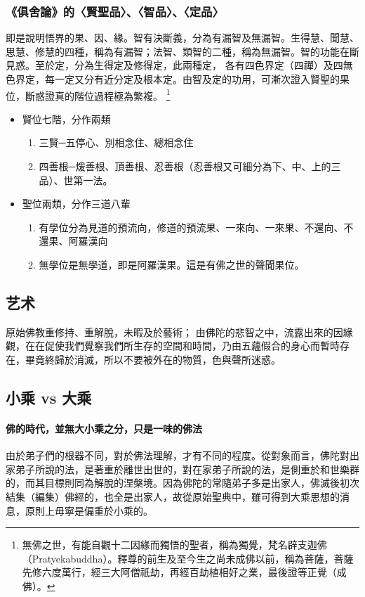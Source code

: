 \subsubsection{《俱舍論》的〈賢聖品〉、〈智品〉、〈定品〉}
即是說明悟界的果、因、緣。智有決斷義，分為有漏智及無漏智。生得慧、聞慧、思慧、修慧的四種，稱為有漏智；法智、類智的二種，稱為無漏智。智的功能在斷見惑。至於定，分為生得定及修得定，此兩種定，
各有四色界定（四禪）及四無色界定，每一定又分有近分定及根本定。由智及定的功用，可漸次證入賢聖的果位，斷惑證真的階位過程極為繁複。
\footnote{無佛之世，有能自觀十二因緣而獨悟的聖者，稱為獨覺，梵名辟支迦佛（Pratyekabuddha）。釋尊的前生及至今生之尚未成佛以前，稱為菩薩，菩薩先修六度萬行，經三大阿僧祇劫，再經百劫植相好之業，最後證等正覺（成佛）。}
\begin{itemize}
  \item
    賢位七階，分作兩類
    \begin{enumerate}
      \item 三賢─五停心、別相念住、總相念住
      \item 四善根─煖善根、頂善根、忍善根（忍善根又可細分為下、中、上的三品）、世第一法。
    \end{enumerate}
  \item
    聖位兩類，分作三道八輩
    \begin{enumerate}
      \item 有學位分為見道的預流向，修道的預流果、一來向、一來果、不還向、不還果、阿羅漢向
      \item 無學位是無學道，即是阿羅漢果。這是有佛之世的聲聞果位。
    \end{enumerate}
\end{itemize}


\subsection{艺术}
原始佛教重修持、重解脫，未暇及於藝術；
由佛陀的悲智之中，流露出來的因緣觀，在在促使我們覺察我們所生存的空間和時間，乃由五蘊假合的身心而暫時存在，畢竟終歸於消滅，所以不要被外在的物質，色與聲所迷惑。

\subsection{小乘 vs 大乘}
\paragraph{佛的時代，並無大小乘之分，只是一味的佛法} 由於弟子們的根器不同，對於佛法理解，才有不同的程度。從對象而言，佛陀對出家弟子所說的法，是著重於離世出世的，對在家弟子所說的法，是側重於和世樂群的，而其目標則同為解脫的涅槃境。因為佛陀的常隨弟子多是出家人，佛滅後初次結集（編集）佛經的，也全是出家人，故從原始聖典中，雖可得到大乘思想的消息，原則上毋寧是偏重於小乘的。
